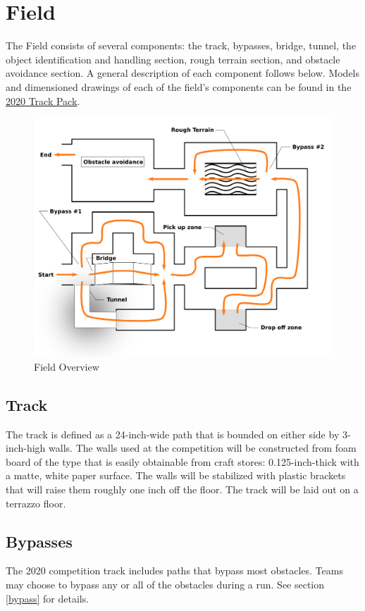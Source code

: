 \section{Field}
The Field consists of several components: the track, bypasses, bridge, tunnel, the object identification and handling section, rough terrain section, and obstacle avoidance section. A general description of each component follows below. Models and dimensioned drawings of each of the field’s components can be found in the {\href{https://mercury.okstate.edu/content/mercury-challenge}{2020 Track Pack}}.

\begin{figure}[H]
	\centering
	\includegraphics[width=.85\textwidth]{images/track_overview_wlabels.png}
	\caption{Field Overview}
	\label{fig:field} 
\end{figure}

\subsection{Track}
The track is defined as a 24-inch-wide path that is bounded on either side by 3-inch-high walls. The walls used at the competition will be constructed from foam board of the type that is easily obtainable from craft stores: 0.125-inch-thick with a matte, white paper surface. The walls will be stabilized with plastic brackets that will raise them roughly one inch off the floor. The track will be laid out on a terrazzo floor.

\subsection{Bypasses}
The 2020 competition track includes paths that bypass most obstacles. Teams may choose to bypass any or all of the obstacles during a run. See section \ref{bypass} for details.

